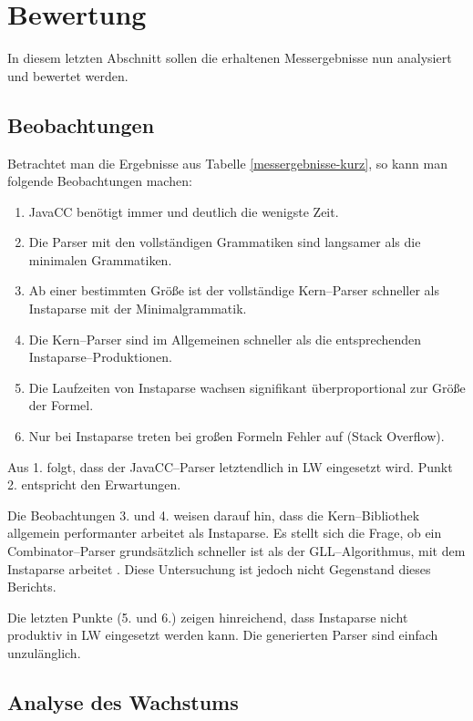 \documentclass[ngerman,a4paper,abstracton,open=right,twoside=false,toc=listofnumbered,bibtotocnumbered]{scrreprt}
\begin{document}
\chapter{Bewertung}

In diesem letzten Abschnitt sollen die erhaltenen Messergebnisse nun analysiert und bewertet werden.

\section{Beobachtungen}

Betrachtet man die Ergebnisse aus Tabelle \ref{messergebnisse-kurz}, so kann man folgende Beobachtungen machen:

\begin{enumerate}
	\item JavaCC benötigt immer und deutlich die wenigste Zeit.
	\item Die Parser mit den vollständigen Grammatiken sind langsamer als die minimalen Grammatiken.
	\item Ab einer bestimmten Größe ist der vollständige Kern--Parser schneller als Instaparse mit der Minimalgrammatik.
	\item Die Kern--Parser sind im Allgemeinen schneller als die entsprechenden Instaparse--Produktionen.
	\item Die Laufzeiten von Instaparse wachsen signifikant überproportional zur Größe der Formel.
	\item Nur bei Instaparse treten bei großen Formeln Fehler auf (Stack Overflow).
\end{enumerate}

Aus 1. folgt, dass der JavaCC--Parser letztendlich in LW eingesetzt wird. Punkt 2. entspricht den Erwartungen.

Die Beobachtungen 3. und 4. weisen darauf hin, dass die Kern--Bibliothek allgemein performanter arbeitet als Instaparse. Es stellt sich die Frage, ob ein Combinator--Parser grundsätzlich schneller ist als der GLL--Algorithmus, mit dem Instaparse arbeitet \cite[\glqq{}Special Thanks\grqq{}]{instaparse}. Diese Untersuchung ist jedoch nicht Gegenstand dieses Berichts.

Die letzten Punkte (5. und 6.) zeigen hinreichend, dass Instaparse nicht produktiv in LW eingesetzt werden kann. Die generierten Parser sind einfach unzulänglich.

\section{Analyse des Wachstums}
\end{document}
